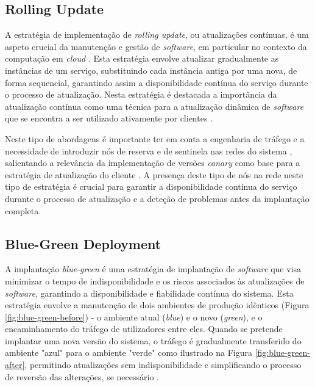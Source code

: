 
\subsection{Rolling Update}

A estratégia de implementação de \textit{rolling update}, ou atualizações contínuas, é um aspeto 
crucial da manutenção e gestão de \textit{software}, em particular no contexto da computação em 
\textit{cloud} \cite{rolling2014}. Esta estratégia envolve atualizar gradualmente as instâncias de 
um serviço, substituindo cada instância antiga por uma nova, de forma sequencial, garantindo assim 
a disponibilidade contínua do serviço durante o processo de atualização. Nesta estratégia é destacada 
a importância da atualização contínua como uma técnica para a atualização dinâmica de \textit{software} 
que se encontra a ser utilizado ativamente por clientes \cite{rolling2014}. 

Neste tipo de abordagens é importante ter em conta a engenharia de tráfego e a necessidade de 
introduzir nós de reserva e de sentinela nas redes do sistema \cite{canary2022}, salientando a 
relevância da implementação de versões \textit{canary} como base para a estratégia de atualização 
do cliente \cite{canary2022}. A presença deste tipo de nós na rede neste tipo de estratégia é 
crucial para garantir a disponibilidade contínua do serviço durante o processo de atualização e a 
deteção de problemas antes da implantação completa.

\subsection{Blue-Green Deployment}

A implantação \textit{blue-green} é uma estratégia de implantação de \textit{software} que visa 
minimizar o tempo de indisponibilidade e os riscos associados às atualizações de \textit{software}, 
garantindo a disponibilidade e fiabilidade contínua do sistema. Esta estratégia envolve a
manutenção de dois ambientes de produção idênticos (Figura \ref{fig:blue-green-before}) - o ambiente atual 
(\textit{blue}) e o novo (\textit{green}), e o encaminhamento do tráfego de utilizadores entre eles. 
Quando se pretende implantar uma nova versão do sistema, o tráfego é gradualmente transferido do 
ambiente "azul" para o ambiente "verde" como ilustrado na Figura \ref{fig:blue-green-after},
permitindo atualizações sem indisponibilidade e simplificando o processo de reversão das 
alterações, se necessário \cite{canary2022}.

